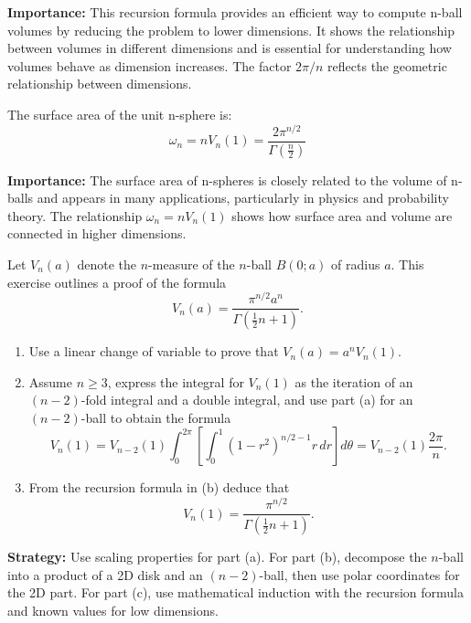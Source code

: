 \noindent\textbf{Importance:} This recursion formula provides an efficient way to compute n-ball volumes by reducing the problem to lower dimensions. It shows the relationship between volumes in different dimensions and is essential for understanding how volumes behave as dimension increases. The factor $2\pi/n$ reflects the geometric relationship between dimensions.



\begin{theorem}
The surface area of the unit n-sphere is:
\[\omega_n = n V_n(1) = \frac{2\pi^{n/2}}{\Gamma(\frac{n}{2})}\]
\end{theorem}

\noindent\textbf{Importance:} The surface area of n-spheres is closely related to the volume of n-balls and appears in many applications, particularly in physics and probability theory. The relationship $\omega_n = n V_n(1)$ shows how surface area and volume are connected in higher dimensions.





\begin{problembox}
\begin{problemstatement}
Let \( V_n(a) \) denote the \( n \)-measure of the \( n \)-ball \( B(0; a) \) of radius \( a \). This exercise outlines a proof of the formula
\[
V_n(a) = \frac{\pi^{n/2} a^n}{\Gamma( \frac{1}{2} n + 1 )}.
\]
\begin{enumerate}[label=(\alph*)]
\item Use a linear change of variable to prove that \( V_n(a) = a^n V_n(1) \).
\item Assume \( n \geq 3 \), express the integral for \( V_n(1) \) as the iteration of an \( (n - 2) \)-fold integral and a double integral, and use part (a) for an \( (n - 2) \)-ball to obtain the formula
\[
V_n(1) = V_{n-2}(1) \int_0^{2\pi} \left[ \int_0^1 (1 - r^2)^{n/2 - 1}r \, dr \right] d\theta = V_{n-2}(1) \frac{2\pi}{n}.
\]
\item From the recursion formula in (b) deduce that
\[
V_n(1) = \frac{\pi^{n/2}}{\Gamma(\frac{1}{2}n + 1)}.
\]
\end{enumerate}
\end{problemstatement}
\end{problembox}

\noindent\textbf{Strategy:} Use scaling properties for part (a). For part (b), decompose the \(n\)-ball into a product of a 2D disk and an \((n-2)\)-ball, then use polar coordinates for the 2D part. For part (c), use mathematical induction with the recursion formula and known values for low dimensions.

